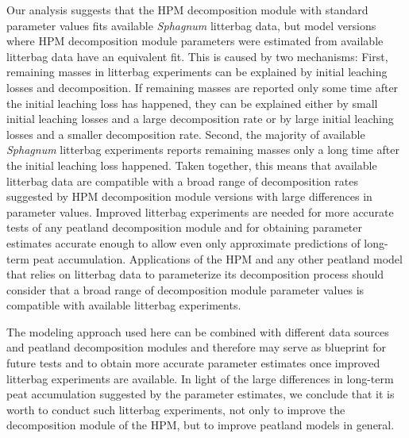 \documentclass[esd, manuscript]{copernicus}
\begin{document}
Our analysis suggests that the HPM decomposition module with standard parameter values fits available \emph{Sphagnum} litterbag data, but model versions where HPM decomposition module parameters were estimated from available litterbag data have an equivalent fit. This is caused by two mechanisms: First, remaining masses in litterbag experiments can be explained by initial leaching losses and decomposition. If remaining masses are reported only some time after the initial leaching loss has happened, they can be explained either by small initial leaching losses and a large decomposition rate or by large initial leaching losses and a smaller decomposition rate. Second, the majority of available \emph{Sphagnum} litterbag experiments reports remaining masses only a long time after the initial leaching loss happened. Taken together, this means that available litterbag data are compatible with a broad range of decomposition rates suggested by HPM decomposition module versions with large differences in parameter values. Improved litterbag experiments are needed for more accurate tests of any peatland decomposition module and for obtaining parameter estimates accurate enough to allow even only approximate predictions of long-term peat accumulation. Applications of the HPM and any other peatland model that relies on litterbag data to parameterize its decomposition process should consider that a broad range of decomposition module parameter values is compatible with available litterbag experiments.

The modeling approach used here can be combined with different data sources and peatland decomposition modules and therefore may serve as blueprint for future tests and to obtain more accurate parameter estimates once improved litterbag experiments are available. In light of the large differences in long-term peat accumulation suggested by the parameter estimates, we conclude that it is worth to conduct such litterbag experiments, not only to improve the decomposition module of the HPM, but to improve peatland models in general.



\end{document}
